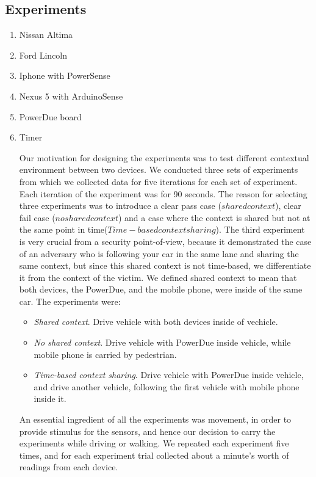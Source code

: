 \documentclass[journal]{IEEEtranTIE}
\begin{document}
\subsection{Experiments}

\begin{enumerate}
\item Nissan Altima
\item Ford Lincoln
\item Iphone with PowerSense
\item Nexus 5 with ArduinoSense
\item PowerDue board
\item Timer
\begin{enumerate}


Our motivation for designing the experiments was to test different contextual
environment between two devices. We conducted three sets of experiments from
which we collected data for five iterations for each set of experiment. Each
iteration of the experiment was for 90 seconds. The reason for selecting three
experiments was to introduce a clear pass case ($shared context$), clear fail
case ($no shared context$) and a case where the context is shared but not at the
same point in time($Time-based context sharing$). The third experiment is very
crucial from a security point-of-view, because it demonstrated the case of an
adversary who is following your car in the same lane and sharing the same
context, but since this shared context is not time-based, we differentiate it
from the context of the victim. We defined shared context to mean that both
devices, the PowerDue, and the mobile phone, were inside of the same car. The
experiments were:

\begin{itemize}
\item \textit{Shared context}. Drive vehicle with both devices inside of
      vechicle.
\item \textit{No shared context}. Drive vehicle with PowerDue inside vehicle,
      while mobile phone is carried by pedestrian.
\item \textit{Time-based context sharing}. Drive vehicle with PowerDue inside
      vehicle, and drive another vehicle, following the first vehicle with
      mobile phone inside it.
\end{itemize}

An essential ingredient of all the experiments was movement, in order to provide
stimulus for the sensors, and hence our decision to carry the experiments while
driving or walking. We repeated each experiment five times, and for each
experiment trial collected about a minute's worth of readings from each device.


\end{enumerate}
\end{enumerate}
\end{document}
